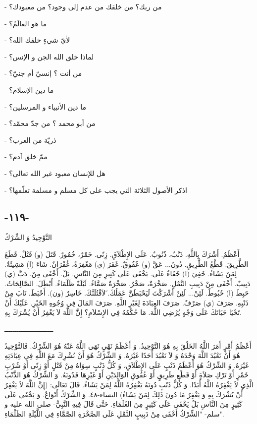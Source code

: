\documentclass[a5paper]{article}
\begin{document}
- من ربك؟ من خلقك من عدم إلى وجود؟ من معبودك؟ 

- ما هو العالَمُ؟

- لأيّ شيءٍ خلقك الله؟

- لماذا خلق الله الجن و الإنس؟

- من أنت ؟ إنسيّ أم جنيّ؟

- ما دين الإسلام؟

- ما دين الأنبياء و المرسلين؟

- من أبو محمد ؟ من جدّ محمّد؟

- ذريّة من العرب؟

- ممّ خلق آدم؟

- هل للإنسان معبود غير الله تعالى؟

- اذكر الأصول الثلاثة التي يجب على كل مسلم و مسلمة تعلّمها؟ 

\subsection{-١١٩-}
التَّوْحِيدُ وَ الشِّرْكُ

أَعْظَمُ. أَشْرَكَ بِاللَّهِ. ذَنْبٌ، ذُنُوبٌ. عَلَى الإِطْلاَقِ. زِنًى. خَمْرٌ، خُمُورٌ. قَتَلَ (و) قَتْلٌ. قَطَعَ الطَّرِيقَ. قَطْعُ الطَّرِيقِ. دُونَ... عَقَّ (و) عُقُوقٌ. غَفَرَ (ي) مَغْفِرَةٌ، غُفْرَانٌ. شَاءَ (ا) مَشِيئَةٌ. لِمَنْ يَشَاءُ. خَفِيَ (ا) خَفَاءٌ عَلَى. يَخْفَى عَلَى كَثِيرٍ مِنَ النَّاسِ. بَلْ. أَخْفَى مِنْ. دَبَّ (ي) دَبِيبٌ. أَخْفَى مِنْ دَبِيبِ النَّمْلِ. صَخْرَةٌ، صَخْرٌ. صَخْرَةٌ صَمَّاءُ. لَيْلَةٌ ظَلْمَاءُ. أَبْطَلَ. الصَّالِحَاتُ. حَبِطَ (ا) حُبُوطٌ. لَئِنْ... لَئِنْ أَشْرَكْتَ لَيَحْبَطَنَّ عَمَلُكَ. َلاَقْتُلَنَّكَ. خَاسِرٌ (ون). أَحْبَطَ. تَابَ مِنْ ذَنْبِهِ. صَرَفَ (ي) صَرْفٌ. صَرَفَ العِبَادَةَ لِغَيْرِ اللَّهِ. صَرَفَ المَالَ فِي وُجُوهِ الخَيْرِ. عَلَيْكَ أَنْ تَحْيَا حَيَاتَكَ عَلَى وَجْهٍ يُرْضِي اللَّهَ. مَا حُكْمُهُ فِي الإِسْلاَمِ؟ إِنَّ اللَّهَ لاَ يَغْفِرُ أَنْ يُشْرَكَ بِهِ. 

ــــــــــــــــــــــــ

أَعْظَمُ أَمْرٍ أَمَرَ اللَّهُ الخَلْقَ بِهِ هُوَ التَّوْحِيدُ. وَ أَعْظَمُ نَهْيٍ نَهَى اللَّهُ عَنْهُ هُوَ الشِّرْكُ. فَالتَّوْحِيدُ هُوَ أَنْ نَعْبُدَ اللَّهَ وَحْدَهُ وَ لاَ نَعْبُدَ أَحَدًا غَيْرَهُ. وَ الشِّرْكُ هُوَ أَنْ نُشْرِكَ مَعَ اللَّهِ فِي عِبَادَتِهِ غَيْرَهُ. وَ الشِّرْكُ هُوَ أَعْظَمُ ذَنْبٍ عَلَى الإِطْلاَقِ، وَ كُلُّ ذَنْبٍ سِوَاهُ مِنْ قَتْلٍ أَوْ زِنًى أَوْ شُرْبِ خَمْرٍ أَوْ تَرْكِ صَلاَةٍ أَوْ قَطْعِ طَرِيقٍ أَوْ عُقُوقِ الوَالِدَيْنِ أَوْ غَيْرِهَا فَدُونَهُ. وَ الشِّرْكُ هُوَ الذَّنْبُ الَّذِي لاَ يَغْفِرُهُ اللَّهُ أَبَدًا. وَ كُلُّ ذَنْبٍ دُونَهُ يَغْفِرُهُ اللَّهُ لِمَنْ يَشَاءُ. قَالَ تَعَالَى: (إِنَّ اللَّهَ لاَ يَغْفِرُ أَنْ يُشْرَكَ بِهِ وَ يَغْفِرُ مَا دُونَ ذَلِكَ لِمَنْ يَشَاءُ) النساء-٤٨. وَ الشِّرْكُ أَنْوَاعٌ. وَ يَخْفَى عَلَى كَثِيرٍ مِنَ النَّاسِ بَلْ يَخْفَى عَلَى كَثِيرٍ مِنَ العُلَمَاءِ. حَتَّى قَالَ فِيهِ النَّبِيُّ- صلى الله عليه و سلم- "الشِّرْكُ أَخْفَى مِنْ دَبِيبٍ النَّمْلِ عَلَى الصَّخْرَةِ الصَّمَّاءِ فِي اللَّيْلَةِ الظَلْمَاءِ".
\end{document}
